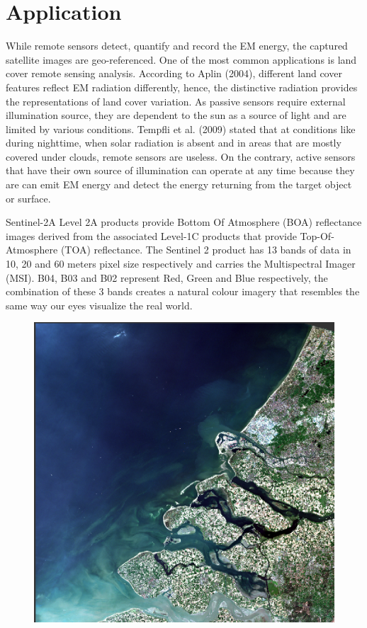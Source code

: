 \documentclass[
  letterpaper,
  DIV=11,
  numbers=noendperiod]{scrreprt}
\begin{document}
\hypertarget{application}{%
\section{Application}\label{application}}

While remote sensors detect, quantify and record the EM energy, the
captured satellite images are geo-referenced. One of the most common
applications is land cover remote sensing analysis. According to Aplin
(2004), different land cover features reflect EM radiation differently,
hence, the distinctive radiation provides the representations of land
cover variation. As passive sensors require external illumination
source, they are dependent to the sun as a source of light and are
limited by various conditions. Tempfli et al. (2009) stated that at
conditions like during nighttime, when solar radiation is absent and in
areas that are mostly covered under clouds, remote sensors are useless.
On the contrary, active sensors that have their own source of
illumination can operate at any time because they are can emit EM energy
and detect the energy returning from the target object or surface.

Sentinel-2A Level 2A products provide Bottom Of Atmosphere (BOA)
reflectance images derived from the associated Level-1C products that
provide Top-Of-Atmosphere (TOA) reflectance. The Sentinel 2 product has
13 bands of data in 10, 20 and 60 meters pixel size respectively and
carries the Multispectral Imager (MSI). B04, B03 and B02 represent Red,
Green and Blue respectively, the combination of these 3 bands creates a
natural colour imagery that resembles the same way our eyes visualize
the real world.

\begin{figure}

{\centering \includegraphics[width=1\textwidth,height=\textheight]{./figures/Screenshot 2023-02-08 at 9.10.51 PM.png}

}

\end{figure}
\end{document}
